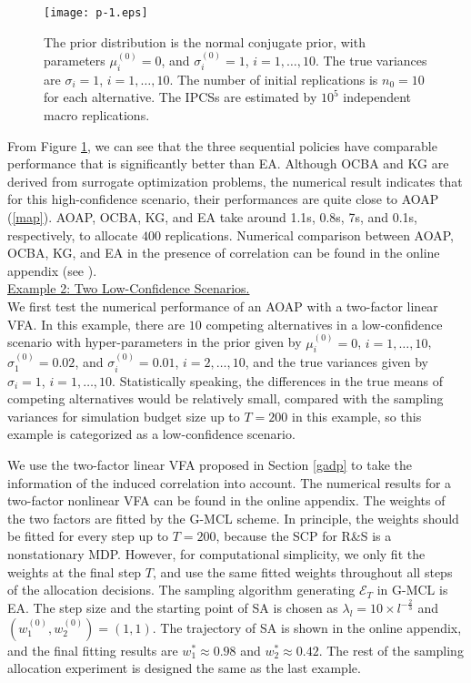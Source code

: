 \documentclass[journal]{IEEEtran}
\begin{document}
   \begin{figure}[tb]
   \begin{center}
   \texttt{[image: p-1.eps]}
   \caption{ The prior distribution is the normal conjugate prior, with parameters $\mu_i^{(0)}=0$, and $\sigma^{(0)}_i=1$, $i=1,\ldots,10$. The true variances are $\sigma_i=1$, $i=1,\ldots,10$. The number of initial replications is $n_0=10$ for each alternative.
   The IPCSs are estimated by $10^5$ independent macro replications.}
   \label{pic1} 
   \end{center} \end{figure}   
   
   
   From Figure \ref{pic1}, we can see that the three sequential policies have comparable performance that is significantly better than EA. Although OCBA and KG are derived from surrogate optimization problems, the numerical result indicates that for this high-confidence scenario, their performances are quite close to AOAP (\ref{map}). AOAP, OCBA, KG, and EA take around 1.1s, 0.8s, 7s, and 0.1s, respectively, to allocate $400$ replications.
   Numerical comparison between AOAP, OCBA, KG, and EA in the presence of correlation can be found in the online appendix (see \cite{peng2017stochastic}).\\
   
    \noindent\underline{Example 2: Two Low-Confidence Scenarios.}\\
   
     We first test the numerical performance of an AOAP with a two-factor linear VFA. In this example, there are $10$ competing alternatives in a low-confidence scenario with hyper-parameters in the prior given by $\mu_i^{(0)}=0$, $i=1,\ldots,10$,  $\sigma^{(0)}_{1}=0.02$, and $\sigma^{(0)}_i=0.01$, $i=2,\ldots,10$, and the true variances given by $\sigma_i=1$, $i=1,\ldots,10$. Statistically speaking, the differences in the true means of competing alternatives would be relatively small, compared with the sampling variances for simulation budget size up to $T=200$ in this example, so this example is categorized as a low-confidence scenario. 
     
           
 We use the two-factor linear VFA proposed in Section \ref{gadp} to take the information of the induced correlation into account. The numerical results for a two-factor nonlinear VFA can be found in the online appendix. The weights of the two factors are fitted by the G-MCL scheme. In principle, the weights should be fitted for every step  up to $T=200$, because the SCP for R\&S is a nonstationary MDP. However, for computational simplicity, we only fit the weights at the final step $T$, and use the same fitted weights throughout all steps of the allocation decisions. The sampling algorithm generating $\mathcal{E}_T$ in G-MCL is EA. 
  The step size and the starting point of SA is chosen as $\lambda_l=10\times l^{-\frac{2}{3}}$ and $(w_1^{(0)},w_2^{(0)})=(1,1)$. The trajectory of SA is shown in the online appendix, and the final fitting results are $w_1^{*}\approx 0.98$ and $w_2^{*}\approx 0.42$. The rest of the sampling allocation experiment is designed the same as the last example. 
     
\end{document}
